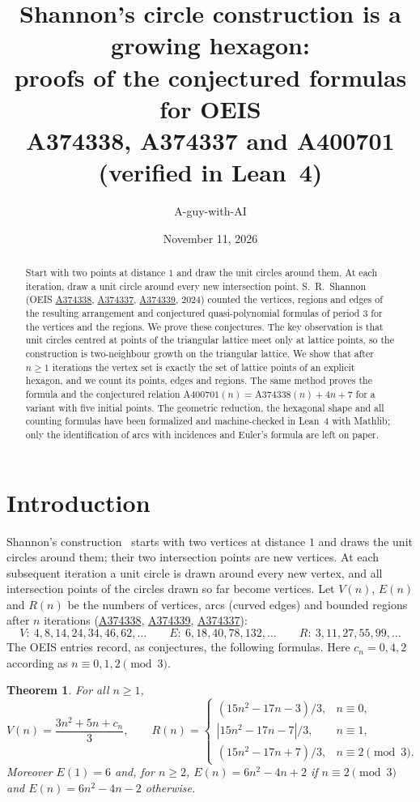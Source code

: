 \documentclass[11pt,a4paper]{amsart}
\title[Shannon's circle construction is a growing hexagon]{Shannon's circle construction is a growing hexagon:\\ proofs of the conjectured formulas for OEIS\\ A374338, A374337 and A400701 (verified in Lean~4)}
\author{A-guy-with-AI}
\date{November 11, 2026}
\newtheorem{theorem}{Theorem}
\theoremstyle{definition}
\theoremstyle{remark}
\newcommand{\oeis}[1]{\href{https://oeis.org/#1}{#1}}
\begin{document}
\begin{abstract}
Start with two points at distance $1$ and draw the unit circles around them. At each iteration, draw a unit circle around every new intersection point. S.~R.~Shannon (OEIS \oeis{A374338}, \oeis{A374337}, \oeis{A374339}, 2024) counted the vertices, regions and edges of the resulting arrangement and conjectured quasi-polynomial formulas of period $3$ for the vertices and the regions. We prove these conjectures. The key observation is that unit circles centred at points of the triangular lattice meet only at lattice points, so the construction is two-neighbour growth on the triangular lattice. We show that after $n\ge1$ iterations the vertex set is exactly the set of lattice points of an explicit hexagon, and we count its points, edges and regions. The same method proves the formula and the conjectured relation $\mathrm{A400701}(n)=\mathrm{A374338}(n)+4n+7$ for a variant with five initial points. The geometric reduction, the hexagonal shape and all counting formulas have been formalized and machine-checked in Lean~4 with Mathlib; only the identification of arcs with incidences and Euler's formula are left on paper.
\end{abstract}

\maketitle

\section{Introduction}

Shannon's construction~\cite{A374338} starts with two vertices at distance $1$ and draws the unit circles around them; their two intersection points are new vertices. At each subsequent iteration a unit circle is drawn around every new vertex, and all intersection points of the circles drawn so far become vertices. Let $V(n)$, $E(n)$ and $R(n)$ be the numbers of vertices, arcs (curved edges) and bounded regions after $n$ iterations (\oeis{A374338}, \oeis{A374339}, \oeis{A374337}):
\[
V:\ 4,8,14,24,34,46,62,\dots \qquad E:\ 6,18,40,78,132,\dots \qquad R:\ 3,11,27,55,99,\dots
\]
The OEIS entries record, as conjectures, the following formulas. Here $c_n=0,4,2$ according as $n\equiv0,1,2\pmod3$.

\begin{theorem}\label{thm:main}
For all $n\ge1$,
\[
V(n)=\frac{3n^2+5n+c_n}{3},\qquad
R(n)=\begin{cases}(15n^2-17n-3)/3,& n\equiv0,\\ |15n^2-17n-7|/3,& n\equiv1,\\ (15n^2-17n+7)/3,& n\equiv2 \pmod 3.\end{cases}
\]
Moreover $E(1)=6$ and, for $n\ge2$, $E(n)=6n^2-4n+2$ if $n\equiv2\pmod3$ and $E(n)=6n^2-4n-2$ otherwise.
\end{theorem}
\end{document}
